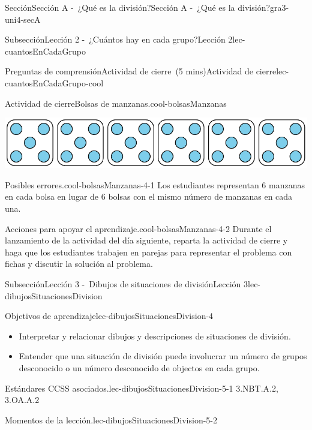 \documentclass[oneside,10pt,]{article}
\begin{document}
\begin{sectionptx}{Sección}{Sección A -~¿Qué es la división?}{}{Sección A -~¿Qué es la división?}{}{}{gra3-uni4-secA}
\begin{subsectionptx}{Subsección}{Lección 2 -~¿Cuántos hay en cada grupo?}{}{Lección 2}{}{}{lec-cuantosEnCadaGrupo}
\begin{reading-questions-subsubsection}{Preguntas de comprensión}{Actividad de cierre~(5 mins)}{}{Actividad de cierre}{}{}{lec-cuantosEnCadaGrupo-cool}
\begin{project}{Actividad de cierre}{Bolsas de manzanas.}{cool-bolsasManzanas}
\begin{image}{0.15}{0.7}{0.15}{}
\includegraphics[width=\linewidth]{external/svg-source/tikz-file-147472.pdf}
\end{image}%
\end{project}%
\par
\begin{paragraphs}{Posibles errores.}{cool-bolsasManzanas-4-1}%
Los estudiantes representan 6 manzanas en cada bolsa en lugar de 6 bolsas con el mismo número de manzanas en cada una.%
\end{paragraphs}%
\begin{paragraphs}{Acciones para apoyar el aprendizaje.}{cool-bolsasManzanas-4-2}%
Durante el lanzamiento de la actividad del día siguiente, reparta la actividad de cierre y haga que los estudiantes trabajen en parejas para representar el problema con fichas y discutir la solución al problema.%
\end{paragraphs}%
\end{reading-questions-subsubsection}
\end{subsectionptx}
%
%
\typeout{************************************************}
\typeout{************************************************}
%
\begin{subsectionptx}{Subsección}{Lección 3 -~Dibujos de situaciones de división}{}{Lección 3}{}{}{lec-dibujosSituacionesDivision}
\begin{objectives}{Objetivos de aprendizaje}{lec-dibujosSituacionesDivision-4}
%
\begin{itemize}[label=\textbullet]
\item{}Interpretar y relacionar dibujos y descripciones de situaciones de división.%
\item{}Entender que una situación de división puede involucrar un número de grupos desconocido o un número desconocido de objectos en cada grupo.%
\end{itemize}
\end{objectives}
\begin{introduction}{}%
\begin{paragraphs}{Estándares CCSS asociados.}{lec-dibujosSituacionesDivision-5-1}%
3.NBT.A.2, 3.OA.A.2%
\end{paragraphs}%
\begin{paragraphs}{Momentos de la lección.}{lec-dibujosSituacionesDivision-5-2}%

\end{paragraphs}
\end{introduction}
\end{subsectionptx}
\end{sectionptx}
\end{document}
